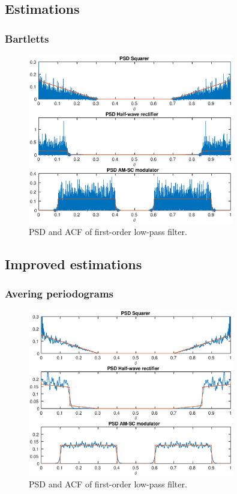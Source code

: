 \subsection{Estimations}

\subsubsection{Bartletts}
\begin{figure}[h]
\centering
\includegraphics[width=0.8\textwidth]{bilder/Lab2/Lab2fig7.eps}
\caption{PSD and ACF of first-order low-pass filter.}
\label{fig:Lab1fig1}
\end{figure}


\subsection{Improved estimations}


\subsubsection{Avering periodograms}
\begin{figure}[h]
\centering
\includegraphics[width=0.8\textwidth]{bilder/Lab2/Lab2fig8.eps}
\caption{PSD and ACF of first-order low-pass filter.}
\label{fig:Lab1fig1}
\end{figure}

